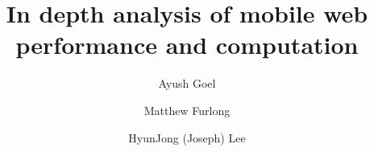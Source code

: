 \documentclass{ns-article-compact}
\begin{document}
\newcommand{\paraspace}{\vspace{0.02in}}
\newcommand{\parab}[1]{\paraspace\noindent{\bf #1} }
\newcommand{\parae}[1]{\paraspace\noindent{\em #1} }
\newcommand{\parabe}[1]{\paraspace\noindent{\bf \em #1} }

\newcommand{\system}{{\sc Pando}\xspace}
\newcommand{\pman}{Placement Manager\xspace}

\def\papertitle{ In depth analysis of mobile
 web performance and computation}

\title{\papertitle}
\author{
  {\rm Ayush Goel}
  \and
  {\rm Matthew Furlong}
  \and
  {\rm HyunJong (Joseph) Lee}
}
\maketitle

\thispagestyle{empty}






\label{lastpage}

\clearpage



\clearpage
\appendix
\end{document}

